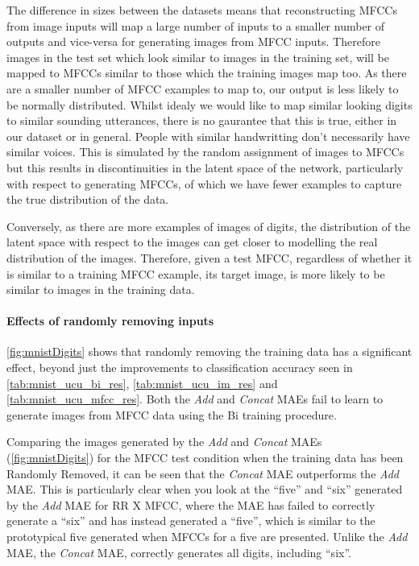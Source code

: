 The difference in sizes between the datasets means that reconstructing \acp{MFCC} from image inputs will map a large number of inputs to a smaller number of outputs and vice-versa for generating images from \ac{MFCC} inputs. Therefore images in the test set which look similar to images in the training set, will be mapped to \acp{MFCC} similar to those which the training images map too. As there are a smaller number of \ac{MFCC} examples to map to, our output is less likely to be normally distributed. Whilst idealy we would like to map similar looking digits to similar sounding utterances, there is no gaurantee that this is true, either in our dataset or in general. People with similar handwritting don't necessarily have similar voices. This is simulated by the random assignment of images to \acp{MFCC} but this results in discontinuities in the latent space of the network, particularly with respect to generating \acp{MFCC}, of which we have fewer examples to capture the true distribution of the data.

Conversely, as there are more examples of images of digits, the distribution of the latent space with respect to the images can get closer to modelling the real distribution of the images. Therefore, given a test \ac{MFCC}, regardless of whether it is similar to a training \ac{MFCC} example, its target image, is more likely to be similar to images in the training data. 

\paragraph{Effects of randomly removing inputs}
\autoref{fig:mnistDigits} shows that randomly removing the training data has a significant effect, beyond just the improvements to classification accuracy seen in \autoref{tab:mnist_ucu_bi_res}, \autoref{tab:mnist_ucu_im_res} and \autoref{tab:mnist_ucu_mfcc_res}. Both the \textit{Add} and \textit{Concat} \acp{MAE} fail to learn to generate images from \ac{MFCC} data using the Bi training procedure.

Comparing the images generated by the \textit{Add} and \textit{Concat} \acp{MAE} (\autoref{fig:mnistDigits}) for the \ac{MFCC} test condition when the training data has been Randomly Removed, it can be seen that the \textit{Concat} \ac{MAE} outperforms the \textit{Add} MAE. This is particularly clear when you look at the ``five'' and ``six'' generated by the \textit{Add} \ac{MAE} for RR X \ac{MFCC}, where the \ac{MAE} has failed to correctly generate a ``six'' and has instead generated a ``five'', which is similar to the prototypical five generated when \acp{MFCC} for a five are presented.
Unlike the \textit{Add} \ac{MAE}, the \textit{Concat} \ac{MAE}, correctly generates all digits, including ``six''.

